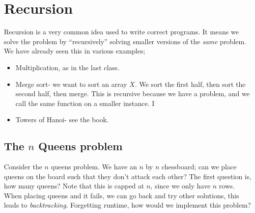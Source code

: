 \section{Recursion} 
Recursion is a very common idea used to write correct programs. It means we solve the problem by ``recursively'' solving smaller versions of the \emph{same} problem.
We have already seen this in various examples; 
\begin{itemize} 
\setlength\itemsep{-.2em}
    \item Multiplication, as in the last class.
    \item Merge sort- we want to sort an array $X$. We sort the first half, then sort the second half, then merge. This is recursive because we have a problem, and we call the same function on a smaller instance. I
    \item Towers of Hanoi- see the book.
\end{itemize}
\subsection{The $n$ Queens problem}
Consider the $n$ queens problem. We have an $n$ by $n$ chessboard; can we place queens on the board such that they don't attack each other? The first question is, how many queens? Note that this is capped at $n$, since we only have $n$ rows. When placing queens and it fails, we can go back and try other solutions, this leads to \emph{backtracking}. Forgetting runtime, how would we implement this problem?

